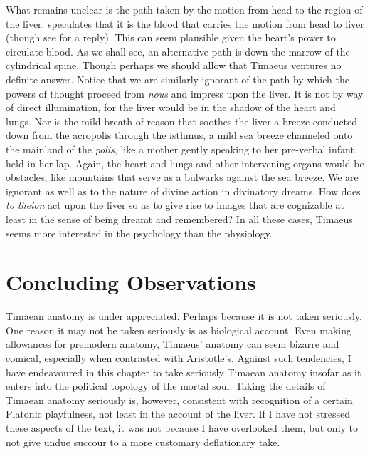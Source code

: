 What remains unclear is the path taken by the motion from head to the region of the liver. \citet{Brisson:1997qr} speculates that it is the blood that carries the motion from head to liver (though see \citealt{Miller:1997up} for a reply). This can seem plausible given the heart's power to circulate blood. As we shall see, an alternative path is down the marrow of the cylindrical spine. Though perhaps we should allow that Timaeus ventures no definite answer. Notice that we are similarly ignorant of the path by which the powers of thought proceed from \emph{nous} and impress upon the liver. It is not by way of direct illumination, for the liver would be in the shadow of the heart and lungs. Nor is the mild breath of reason that soothes the liver a breeze conducted down from the acropolis through the isthmus, a mild sea breeze channeled onto the mainland of the \emph{polis}, like a mother gently speaking to her pre-verbal infant held in her lap. Again, the heart and lungs and other intervening organs would be obstacles, like mountains that serve as a bulwarks against the sea breeze. We are ignorant as well as to the nature of divine action in divinatory dreams. How does \emph{to theion} act upon the liver so as to give rise to images that are cognizable at least in the sense of being dreamt and remembered? In all these cases, Timaeus seems more interested in the psychology than the physiology.


\section{Concluding Observations} %
\label{sec:concluding_observations}

Timaean anatomy is under appreciated. Perhaps because it is not taken seriously. One reason it may not be taken seriously is as biological account. Even making allowances for premodern anatomy, Timaeus' anatomy can seem bizarre and comical, especially when contrasted with Aristotle's. Against such tendencies, I have endeavoured in this chapter to take seriously Timaean anatomy insofar as it enters into the political topology of the mortal soul. Taking the details of Timaean anatomy seriously is, however, consistent with recognition of a certain Platonic playfulness, not least in the account of the liver. If I have not stressed these aspects of the text, it was not because I have overlooked them, but only to not give undue succour to a more customary deflationary take.



